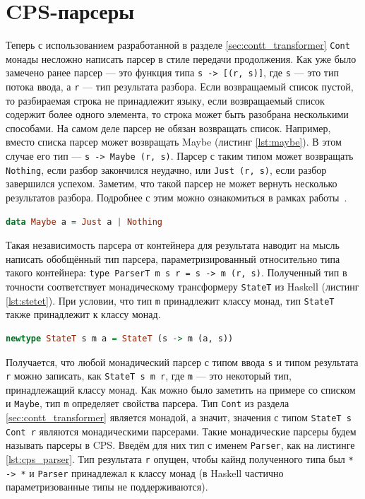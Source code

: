 \documentclass[times]{itmo-student-thesis}
\begin{document}
\section{CPS-парсеры}\label{sec:cps_parser}

Теперь с использованием разработанной в разделе \ref{sec:contt_transformer} \lstinline{Cont} монады несложно написать парсер в стиле 
передачи продолжения. Как уже было замечено ранее парсер --- это функция типа \lstinline{s -> [(r, s)]}, где \lstinline{s} --- это
тип потока ввода, а \lstinline{r} --- тип результата разбора. Если возвращаемый список пустой, то разбираемая строка не принадлежит
языку, если возвращаемый список содержит более одного элемента, то строка может быть разобрана несколькими способами.
На самом деле парсер не обязан возвращать список. Например, вместо списка парсер может возвращать Maybe (листинг \ref{lst:maybe}).
В этом случае его тип --- \lstinline{s -> Maybe (r, s)}. Парсер с таким типом может возвращать \lstinline{Nothing}, если разбор 
закончился неудачно, или \lstinline{Just (r, s)}, если разбор завершился успехом. Заметим, что такой парсер не может вернуть 
несколько результатов разбора. Подробнее с этим можно ознакомиться в рамках работы~\cite{hutton_monadic_1999}.

\begin{lstlisting}[language=Haskell,float=!h,caption={Тип Maybe в Haskell},label={lst:maybe}]
  data Maybe a = Just a | Nothing
\end{lstlisting}

Такая независимость парсера от контейнера для результата наводит на мысль написать обобщённый тип парсера,
параметризированный относительно типа такого контейнера: \lstinline {type ParserT m s r = s -> m (r, s)}. Полученный
тип в точности соответствует монадическому трансформеру \lstinline{StateT} из Haskell (листинг \ref{lst:stetet}). При условии, что	тип
\lstinline{m} принадлежит классу монад, тип \lstinline{StateT} также принадлежит к классу монад. 

\begin{lstlisting}[language=Haskell,float=!h,caption={StateT трансформер монад},label={lst:stetet}]
  newtype StateT s m a = StateT (s -> m (a, s))
\end{lstlisting}

Получается, что любой монадический парсер с типом ввода \lstinline{s} и типом результата \lstinline{r} можно
записать, как \lstinline{StateT s m r}, где \lstinline{m} --- это некоторый тип, принадлежащий классу монад. Как можно 
было заметить на примере со списком и \lstinline{Maybe}, тип \lstinline{m} определяет свойства парсера. 
Тип \lstinline{Cont} из раздела \ref{sec:contt_transformer} является монадой, а значит, значения с типом
\lstinline{StateT s Cont r} являются монадическими парсерами. Такие монадические парсеры будем называть парсеры
в CPS. Введём для них тип с именем \lstinline{Parser}, как на листинге \ref{lst:cps_parser}. Тип результата
\lstinline{r} опущен, чтобы кайнд полученного типа был \lstinline{* -> *} и \lstinline{Parser} принадлежал к
классу монад (в Haskell частично параметризованные типы не поддерживаются).
\end{document}
